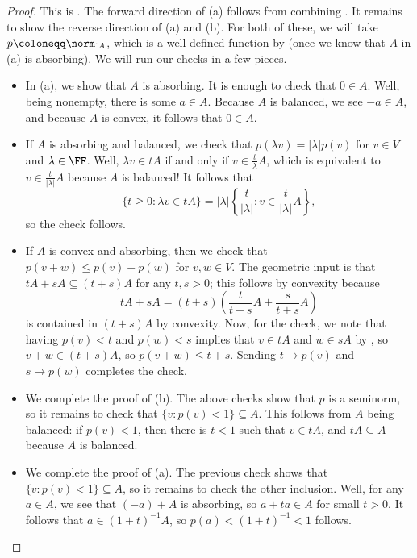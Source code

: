 \documentclass[notes.tex]{subfiles}
\begin{document}
\begin{proof}
	This is \cite[Proposition~1.14]{conway-functional}. The forward direction of (a) follows from combining . It remains to show the reverse direction of (a) and (b). For both of these, we will take $p\coloneqq\norm\cdot_A$, which is a well-defined function by  (once we know that $A$ in (a) is absorbing). We will run our checks in a few pieces.
	\begin{itemize}
		\item In (a), we show that $A$ is absorbing. It is enough to check that $0\in A$. Well, being nonempty, there is some $a\in A$. Because $A$ is balanced, we see $-a\in A$, and because $A$ is convex, it follows that $0\in A$.
		\item If $A$ is absorbing and balanced, we check that $p(\lambda v)=\left|\lambda\right|p(v)$ for $v\in V$ and $\lambda\in\FF$. Well, $\lambda v\in tA$ if and only if $v\in\frac t\lambda A$, which is equivalent to $v\in\frac t{\left|\lambda\right|}A$ because $A$ is balanced! It follows that
		\[\{t\ge0:\lambda v\in tA\}=\left|\lambda\right|\left\{\frac t{\left|\lambda\right|}:v\in\frac t{\left|\lambda\right|}A\right\},\]
		so the check follows.
		\item If $A$ is convex and absorbing, then we check that $p(v+w)\le p(v)+p(w)$ for $v,w\in V$. The geometric input is that $tA+sA\subseteq(t+s)A$ for any $t,s>0$; this follows by convexity because
		\[tA+sA=(t+s)\left(\frac t{t+s}A+\frac s{t+s}A\right)\]
		is contained in $(t+s)A$ by convexity. Now, for the check, we note that having $p(v)<t$ and $p(w)<s$ implies that $v\in tA$ and $w\in sA$ by , so $v+w\in(t+s)A$, so $p(v+w)\le t+s$. Sending $t\to p(v)$ and $s\to p(w)$ completes the check.
		\item We complete the proof of (b). The above checks show that $p$ is a seminorm, so it remains to check that $\{v:p(v)<1\}\subseteq A$. This follows from $A$ being balanced: if $p(v)<1$, then there is $t<1$ such that $v\in tA$, and $tA\subseteq A$ because $A$ is balanced.
		\item We complete the proof of (a). The previous check shows that $\{v:p(v)<1\}\subseteq A$, so it remains to check the other inclusion. Well, for any $a\in A$, we see that $(-a)+A$ is absorbing, so $a+ta\in A$ for small $t>0$. It follows that $a\in(1+t)^{-1}A$, so $p(a)<(1+t)^{-1}<1$ follows.
		\qedhere
	\end{itemize}
\end{proof}
\end{document}
